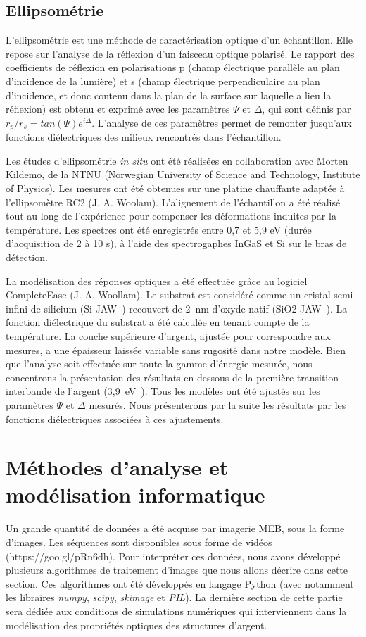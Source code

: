 	\subsection{Ellipsométrie}
L'ellipsométrie est une méthode de caractérisation optique d'un échantillon. Elle repose sur l'analyse de la réflexion d'un faisceau optique polarisé. Le rapport des coefficients de réflexion en polarisations p (champ électrique parallèle au plan d'incidence de la lumière) et s (champ électrique perpendiculaire au plan d'incidence, et donc contenu dans la plan de la surface sur laquelle a lieu la réflexion) est obtenu et exprimé avec les paramètres $\Psi$ et $\Delta$, qui sont définis par $r_p/r_s = tan(\Psi)e^{i\Delta}$. L'analyse de ces paramètres permet de remonter jusqu'aux fonctions diélectriques des milieux rencontrés dans l'échantillon.\par 
Les études d'ellipsométrie \textit{in situ} ont été réalisées en collaboration avec Morten Kildemo, de la NTNU (Norwegian University of Science and Technology, Institute of Physics). Les mesures ont été obtenues sur une platine chauffante adaptée à l'ellipsomètre RC2 (J. A. Woolam). L'alignement de l'échantillon a été réalisé tout au long de l'expérience pour compenser les déformations induites par la température. Les spectres ont été enregistrés entre 0,7 et 5,9 eV (durée d'acquisition de 2 à 10 s), à l'aide des spectrogaphes InGaS et Si sur le bras de détection.\par 
La modélisation des réponses optiques a été effectuée grâce au logiciel CompleteEase (J. A. Woollam). Le substrat est considéré comme un cristal semi-infini de silicium (Si JAW~\cite{herzinger1998ellipsometric}) recouvert de 2~nm d'oxyde natif (SiO2 JAW~\cite{herzinger1998ellipsometric}). La fonction diélectrique du substrat a été calculée en tenant compte de la température. La couche supérieure d'argent, ajustée pour correspondre aux mesures, a une épaisseur laissée variable sans rugosité dans notre modèle. Bien que l'analyse soit effectuée sur toute la gamme d'énergie mesurée, nous concentrons la présentation des résultats en dessous de la première transition interbande de l'argent (3,9~eV~\cite{oates2005evolution}). Tous les modèles ont été ajustés sur les paramètres $\Psi$ et $\Delta$ mesurés. Nous présenterons par la suite les résultats par les fonctions diélectriques associées à ces ajustements. \par 

\section{Méthodes d'analyse et modélisation informatique}
Un grande quantité de données a été acquise par imagerie MEB, sous la forme d'images. Les séquences sont disponibles sous forme de vidéos (https://goo.gl/pRn6dh). Pour interpréter ces données, nous avons développé plusieurs algorithmes de traitement d'images que nous allons décrire dans cette section. Ces algorithmes ont été développés en langage Python (avec notamment les libraires \textit{numpy}, \textit{scipy}, \textit{skimage} et \textit{PIL}). La dernière section de cette partie sera dédiée aux conditions de simulations numériques qui interviennent dans la modélisation des propriétés optiques des structures d'argent.\par 
